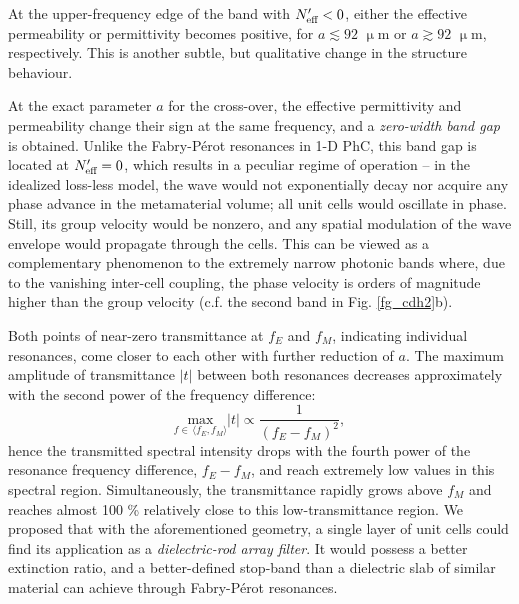 At the upper-frequency edge of the band with $N_{\text{eff} }'<0$, either the effective permeability or permittivity becomes positive, for $a\lesssim 92$ $\upmu$m or  $a\gtrsim 92$ $\upmu$m, respectively. This is another subtle, but qualitative change in the structure behaviour. 

At the exact parameter $a$ for the cross-over, the effective permittivity and permeability change their sign at the same frequency, and a \textit{zero-width band gap} is obtained. Unlike the Fabry-Pérot resonances in 1-D PhC, this band gap is located at $N_{\text{eff} }'=0$, which results in a peculiar regime of operation -- in the idealized loss-less model, the wave would not exponentially decay nor acquire any phase advance in the metamaterial volume; all unit cells would oscillate in phase. Still, its group velocity would be nonzero, and any spatial modulation of the wave envelope would propagate through the cells. This can be viewed as a complementary phenomenon to the extremely narrow photonic bands where, due to the vanishing inter-cell coupling, the phase velocity is orders of magnitude higher than the group velocity (c.f. the second band in Fig. \ref{fg_cdh2}b).

Both points of near-zero transmittance at $f_E$ and $f_M$, indicating individual resonances, come closer to each other with further reduction of $a$. The maximum amplitude of transmittance $|t|$ between both resonances decreases approximately with the second power of the frequency difference:
\begin{equation} \underset{f \in\,\langle f_E,f_M\rangle}{\text{max}} |t| \propto \frac{1}{(f_E-f_M)^{2}}, \label{eq_fEfM}\end{equation}
hence the transmitted spectral intensity drops with the fourth power of the resonance frequency difference, $f_E-f_M$, and reach extremely low values in this spectral region. Simultaneously, the transmittance rapidly grows above $f_M$ and reaches almost 100 \% relatively close to this low-transmittance region. 
We proposed \cite{dominec2014transition} that with the aforementioned geometry, a single layer of unit cells could find its application as a \textit{dielectric-rod array filter}. It would possess a better extinction ratio, and a better-defined stop-band than a dielectric slab of similar material can achieve through Fabry-Pérot resonances.

